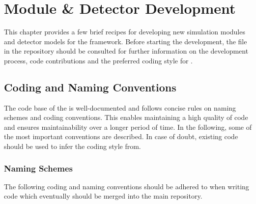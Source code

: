 \chapter{Module \& Detector Development}
\label{ch:development}

This chapter provides a few brief recipes for developing new simulation modules and detector models for the \apsq framework.
Before starting the development, the  file in the repository should be consulted for further information on the development process, code contributions and the preferred coding style for \apsq.

\section{Coding and Naming Conventions}

The code base of the \apsq is well-documented and follows concise rules on naming schemes and coding conventions.
This enables maintaining a high quality of code and ensures maintainability over a longer period of time.
In the following, some of the most important conventions are described.
In case of doubt, existing code should be used to infer the coding style from.

\subsection{Naming Schemes}

The following coding and naming conventions should be adhered to when writing code which eventually should be merged into the main repository.

